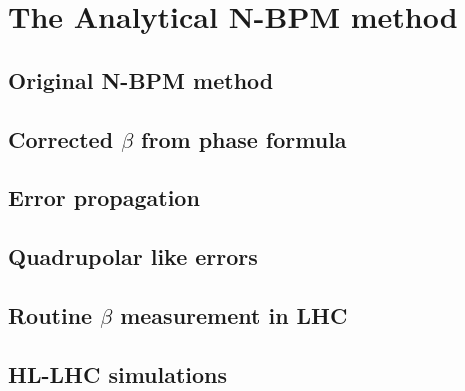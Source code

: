 \chapter{The Analytical N-BPM method}

\section{Original N-BPM method}
\lipsum[11-20]

\section{Corrected $\beta$ from phase formula}
\lipsum[21-30]

\section{Error propagation}
\lipsum[41-50]

\section{Quadrupolar like errors}
\lipsum[51-60]

\section{Routine $\beta$ measurement in LHC}
\lipsum[71-80]

\section{HL-LHC simulations}
\lipsum[61-70]

